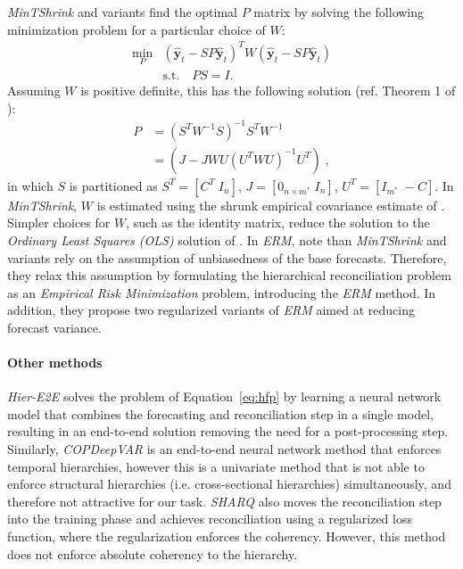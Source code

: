 \documentclass[preprint, 3p, times, twocolumn]{elsarticle}
\begin{document}
\textit{MinTShrink} \cite{wickramasuriya_optimal_2019} and variants find the optimal \(P\) matrix by solving the following minimization problem for a particular choice of \(W\):
\begin{align}
  \min_P &(\hat{\textbf{y}}_{t} - SP\hat{\textbf{y}}_{t})^T W (\hat{\textbf{y}}_{t} - SP\hat{\textbf{y}}_{t}) \nonumber \\
  & \text{s.t.} \quad PS=I.
\end{align}
Assuming \(W\) is positive definite, this has the following solution (ref. Theorem 1 of \cite{wickramasuriya_optimal_2019}):
\begin{align} 
  P &= (S^TW^{-1}S)^{-1}S^TW^{-1} \nonumber \\
    &= (J - JWU(U^TWU)^{-1}U^T) \;, \label{eq:p1}
\end{align}
in which \(S\) is partitioned as \(S^T = [C^T \; I_n]\), \(J = [0_{n \times m^*} \; I_n]\), \(U^T = [I_{m^*} \; -C]\). In \textit{MinTShrink}, \(W\) is estimated using the shrunk empirical covariance estimate of \cite{schafer_shrinkage_2005}. Simpler choices for \(W\), such as the identity matrix, reduce the solution to the \textit{Ordinary Least Squares (OLS)} solution of \cite{hyndman_optimal_2011}. In \textit{ERM}, \citet{bentaieb_regularized_2019} note than \textit{MinTShrink} and variants rely on the assumption of unbiasedness of the base forecasts. Therefore, they relax this assumption by formulating the hierarchical reconciliation problem as an \textit{Empirical Risk Minimization} problem, introducing the \textit{ERM} method. In addition, they propose two regularized variants of \textit{ERM} aimed at reducing forecast variance.

\paragraph{Other methods} \textit{Hier-E2E} \cite{rangapuram_endtoend_2021} solves the problem of Equation~\eqref{eq:hfp} by learning a neural network model that combines the forecasting and reconciliation step in a single model, resulting in an end-to-end solution removing the need for a post-processing step. Similarly, \textit{COPDeepVAR} \cite{rangapuram_coherent_2023} is an end-to-end neural network method that enforces temporal hierarchies, however this is a univariate method that is not able to enforce structural hierarchies (i.e. cross-sectional hierarchies) simultaneously, and therefore not attractive for our task. \textit{SHARQ} \cite{han_simultaneously_2021} also moves the reconciliation step into the training phase and achieves reconciliation using a regularized loss function, where the regularization enforces the coherency. However, this method does not enforce absolute coherency to the hierarchy.
\end{document}

